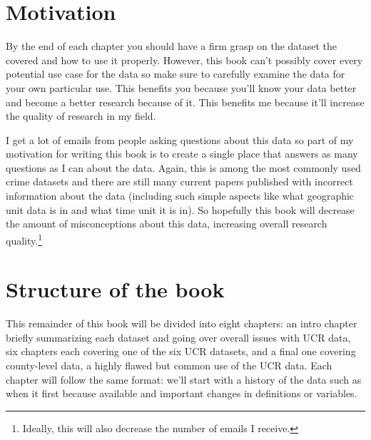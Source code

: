 \documentclass[
  12pt,
  openany]{book}
\begin{document}
\hypertarget{motivation}{%
\section*{Motivation}\label{motivation}}


By the end of each chapter you should have a firm grasp on the dataset the covered and how to use it properly. However, this book can't possibly cover every potential use case for the data so make sure to carefully examine the data for your own particular use. This benefits you because you'll know your data better and become a better research because of it. This benefits me because it'll increase the quality of research in my field.

I get a lot of emails from people asking questions about this data so part of my motivation for writing this book is to create a single place that answers as many questions as I can about the data. Again, this is among the most commonly used crime datasets and there are still many current papers published with incorrect information about the data (including such simple aspects like what geographic unit data is in and what time unit it is in). So hopefully this book will decrease the amount of misconceptions about this data, increasing overall research quality.\footnote{Ideally, this will also decrease the number of emails I receive.}

\hypertarget{structure-of-the-book}{%
\section*{Structure of the book}\label{structure-of-the-book}}


This remainder of this book will be divided into eight chapters: an intro chapter briefly summarizing each dataset and going over overall issues with UCR data, six chapters each covering one of the six UCR datasets, and a final one covering county-level data, a highly flawed but common use of the UCR data. Each chapter will follow the same format: we'll start with a history of the data such as when it first because available and important changes in definitions or variables.
\end{document}
